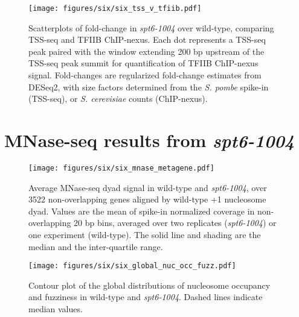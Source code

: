\begin{figure}[h]
\centering
\texttt{[image: figures/six/six\_tss\_v\_tfiib.pdf]}
\caption[Scatterplots of fold-change in \textit{spt6-1004} over wild-type, comparing TSS-seq and TFIIB ChIP-nexus.]{Scatterplots of fold-change in \textit{spt6-1004} over wild-type, comparing TSS-seq and TFIIB ChIP-nexus. Each dot represents a TSS-seq peak paired with the window extending 200 bp upstream of the TSS-seq peak summit for quantification of TFIIB ChIP-nexus signal. Fold-changes are regularized fold-change estimates from DESeq2, with size factors determined from the \textit{S. pombe} spike-in (TSS-seq), or \textit{S. cerevisiae} counts (ChIP-nexus).}
\end{figure}

\lipsum[1]

\section{MNase-seq results from \textit{spt6-1004}}

\begin{figure}[H]
    \centering
    \begin{minipage}[t]{2.875in}
        \centering
        \texttt{[image: figures/six/six\_mnase\_metagene.pdf]}
        \caption[Average MNase-seq dyad signal in wild-type and \textit{spt6-1004}, over non-overlapping genes aligned by wild-type +1 nucleosome dyad.]{Average MNase-seq dyad signal in wild-type and \textit{spt6-1004}, over 3522 non-overlapping genes aligned by wild-type +1 nucleosome dyad. Values are the mean of spike-in normalized coverage in non-overlapping 20 bp bins, averaged over two replicates (\textit{spt6-1004}) or one experiment (wild-type). The solid line and shading are the median and the inter-quartile range.}
        \label{fig:six_mnase_metagene}
    \end{minipage}\hfill
    \begin{minipage}[t]{2.875in}
        \centering
        \texttt{[image: figures/six/six\_global\_nuc\_occ\_fuzz.pdf]}
        \caption[Contour plot of nucleosome occupancy and fuzziness in wild-type and \textit{spt6-1004}.]{Contour plot of the global distributions of nucleosome occupancy and fuzziness in wild-type and \textit{spt6-1004}. Dashed lines indicate median values.}
        \label{fig:six_global_nuc_fuzz}
    \end{minipage}
\end{figure}

\lipsum[1]

